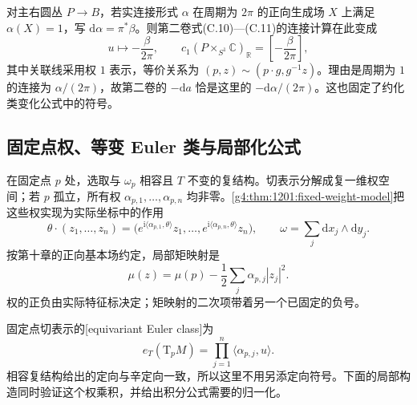 \begin{remark}\label{g4:rem:1206:curvature-sign}
	对主右圆丛 \(P\to B\)，若实连接形式 \(\alpha\) 在周期为 \(2\pi\) 的正向生成场 \(X\) 上满足 \(\alpha(X)=1\)，写 \(\mathrm{d}\alpha=\pi^*\beta\)。则第二卷式(C.10)—(C.11)的连接计算在此变成
	\[
		u\longmapsto-\frac{\beta}{2\pi},
		\qquad
		c_1(P\times_{S^1}\mathbb C)_{\mathbb R}
		=\left[-\frac{\beta}{2\pi}\right],
	\]
	其中关联线采用权 \(1\) 表示，等价关系为 \((p,z)\sim(p\cdot g,g^{-1}z)\)。理由是周期为 \(1\) 的连接为 \(\alpha/(2\pi)\)，故第二卷的 \(-\mathrm{d}a\) 恰是这里的 \(-\mathrm{d}\alpha/(2\pi)\)。这也固定了约化类变化公式中的符号。
\end{remark}

\subsection{固定点权、等变 Euler 类与局部化公式}
\label{g4:subsec:1206:02}
在固定点 \(p\) 处，选取与 \(\omega_p\) 相容且 \(T\) 不变的复结构。切表示分解成复一维权空间；若 \(p\) 孤立，所有权 \(\alpha_{p,1},\ldots,\alpha_{p,n}\) 均非零。\cref{g4:thm:1201:fixed-weight-model}把这些权实现为实际坐标中的作用
\[
	\theta\cdot(z_1,\ldots,z_n)
	=\bigl(e^{\mathrm{i}\langle\alpha_{p,1},\theta\rangle}z_1,\ldots,
	e^{\mathrm{i}\langle\alpha_{p,n},\theta\rangle}z_n\bigr),
	\qquad \omega=\sum_j\mathrm{d}x_j\wedge\mathrm{d}y_j.
\]
按第十章的正向基本场约定，局部矩映射是
\begin{equation}\label{g4:eq:1206:weight-moment}
	\mu(z)=\mu(p)-\frac12\sum_j\alpha_{p,j}|z_j|^2.
\end{equation}
权的正负由实际特征标决定；矩映射的二次项带着另一个已固定的负号。

\ProseParagraphBreak

固定点切表示的[equivariant Euler class]为
\begin{equation}\label{g4:eq:1206:euler-weights}
	e_T(\mathrm{T}_pM)=\prod_{j=1}^n\langle\alpha_{p,j},u\rangle.
\end{equation}
相容复结构给出的定向与辛定向一致，所以这里不用另添定向符号。下面的局部构造同时验证这个权乘积，并给出积分公式需要的归一化。

